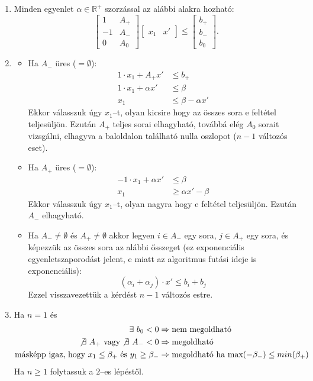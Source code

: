 \begin{enumerate}
  \item Minden egyenlet $\alpha \in \mathbb{R}^+$ szorzással az alábbi alakra hozható:
  \begin{displaymath}
  \begin{bmatrix}
  1  & A_+ \\
  -1 & A_- \\
  0  & A_0
  \end{bmatrix}
  \begin{bmatrix}
  x_1 & 
  x'
  \end{bmatrix}
  \leq
  \begin{bmatrix}
  b_+ \\
  b_- \\
  b_0
  \end{bmatrix}.
  \end{displaymath}
  \item 
  \begin{itemize}
  	\item Ha $A_-$ üres ($=\emptyset$): 
  	\begin{align*}
  	1 \cdot x_1 + A_+ x'     &\leq b_+ \\
  	1 \cdot x_1 + \alpha x' &\leq \beta \\
  	x_1 			  &\leq \beta - \alpha x' 
  	\end{align*} 
    Ekkor válasszuk úgy $x_1$--t, olyan kicsire hogy az összes sora e feltétel
    teljesüljön. Ezután $A_+$ teljes sorai elhagyható, továbbá elég $A_0$
    sorait vizsgálni, elhagyva a baloldalon található nulla oszlopot ($n-1$
    változós eset).
  	
  	\item Ha $A_+$ üres ($=\emptyset$): 
  	\begin{align*}
  	-1 \cdot x_1 + \alpha x'     &\leq \beta \\
  	x_1 			  &\geq \alpha x' - \beta 
  	\end{align*} 
  	Ekkor válasszuk úgy $x_1$--t, olyan nagyra hogy e feltétel teljesüljön.
  	Ezután $A_-$ elhagyható.
  	\item Ha $A_- \neq \emptyset$ és $A_+ \neq \emptyset$ akkor legyen 
  	$i \in A_-$ egy sora, $j \in A_+$ egy sora, és képezzük az összes sora az
  	alábbi ősszeget (ez exponenciális egyenletszaporodást jelent, e miatt az algoritmus
  	futási ideje is exponenciális):
  	\[
  	\left( \alpha_i + \alpha_j \right) \cdot x' \leq b_i + b_j 
  	\]
  	Ezzel visszavezettük a kérdést $n-1$ változós estre.
  \end{itemize}
 \item Ha $n=1$ és 
 \begin{align*}
 \exists~b_0 < 0 &\Rightarrow \mbox{nem megoldható} \\
 \not \exists~A_+ \mbox{ vagy} \not \exists~A_- < 0 &\Rightarrow \mbox{megoldható} \\
 \mbox{másképp igaz, hogy } x_1 \leq \beta_+ \mbox{ és } y_1 \geq \beta_-
 &\Rightarrow \mbox{megoldható ha } \mbox{max}(-\beta_-) \leq min(\beta_+)
 \end{align*} 
  Ha $n \geq 1$ folytassuk a $2$--es lépéstől.
\end{enumerate} 
